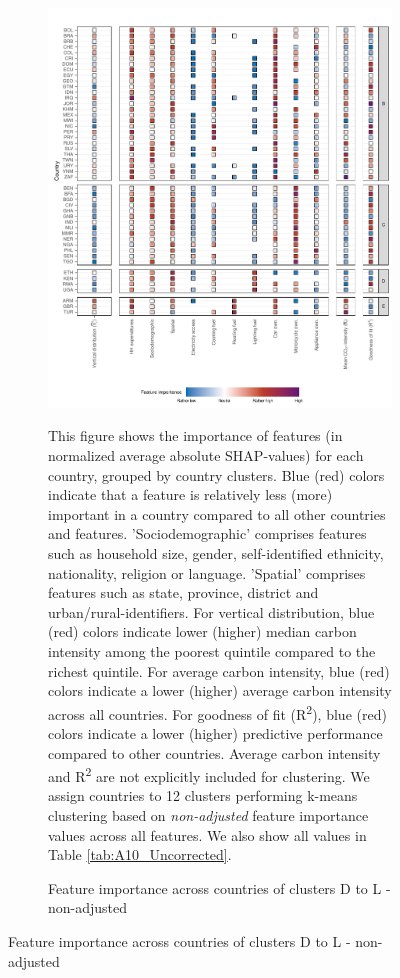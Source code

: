 \clearpage
\begin{figure}[ht!]\ContinuedFloat
    \centering
    \begin{subfigure}[b]{\textwidth}
    \centering
    \includegraphics{Figure 4/Figure_4_Uncorrected_2.pdf}
    \caption{Feature importance across countries of clusters D to L - non-adjusted}\label{fig:fig_4_2_uncorrected}
    \begin{subcaption2}
    This figure shows the importance of features (in normalized average absolute SHAP-values) for each country, grouped by country clusters. Blue (red) colors indicate that a feature is relatively less (more) important in a country compared to all other countries and features. 'Sociodemographic' comprises features such as household size, gender, self-identified ethnicity, nationality, religion or language. 'Spatial' comprises features such as state, province, district and urban/rural-identifiers. For vertical distribution, blue (red) colors indicate lower (higher) median carbon intensity among the poorest quintile compared to the richest quintile. For average carbon intensity, blue (red) colors indicate a lower (higher) average carbon intensity across all countries. For goodness of fit (R\textsuperscript{2}), blue (red) colors indicate a lower (higher) predictive performance compared to other countries. Average carbon intensity and R\textsuperscript{2} are not explicitly included for clustering.
    We assign countries to 12 clusters performing k-means clustering based on \textit{non-adjusted} feature importance values across all features. We also show all values in Table \ref{tab:A10_Uncorrected}.
    \end{subcaption2}
    \end{subfigure}
    
\end{figure}
\clearpage

